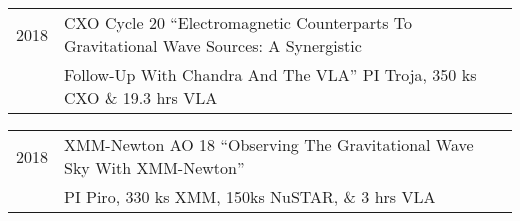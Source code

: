 \documentclass[letterpaper]{article}
\renewenvironment{itemize}{
  \begin{list}{}{
    \setlength{\leftmargin}{1.5em}
  }
}{
  \end{list}
}
\begin{document}
\begin{itemize}
\begin{tabular}{ll}
\end{tabular}
\item \begin{tabular}{ll}
2018	& CXO Cycle 20 ``Electromagnetic Counterparts To Gravitational Wave Sources: A Synergistic\\
	&  Follow-Up With Chandra And The VLA'' PI Troja, 350 ks CXO \& 19.3 hrs VLA
\end{tabular}
\item \begin{tabular}{ll}
2018	& XMM-Newton AO 18  ``Observing The Gravitational Wave Sky With XMM-Newton''\\
	&  PI Piro, 330 ks XMM, 150ks NuSTAR, \& 3 hrs VLA
\end{tabular}
\end{itemize}

\end{document}
